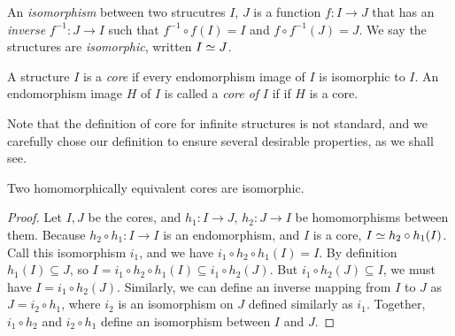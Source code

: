 \documentclass[acmsmall,screen,nonacm,review]{acmart}
\begin{document}
\begin{definition}
    An {\em isomorphism} between two strucutres $I$, $J$ 
    is a function $f: I \rightarrow J$ that 
    has an {\em inverse} $f^{-1}: J \rightarrow I$
    such that $f^{-1} \circ f (I)= I$ and $f \circ f^{-1} (J) = J$.
    We say the structures are {\em isomorphic}, written $I \simeq J$.
\end{definition}

\begin{definition}
    A structure $I$ is a {\em core} if every endomorphism image 
    of $I$ is isomorphic to $I$.
    An endomorphism image $H$ of $I$ is called a {\em core of} $I$ if 
    if $H$ is a core.
\end{definition}

Note that the definition of core for infinite structures is not standard, 
 and we carefully chose our definition to ensure several desirable properties, 
 as we shall see.

\begin{lemma}\label{lem:core-iso}
    Two homomorphically equivalent cores are isomorphic.
\end{lemma}
\begin{proof}
    Let $I, J$ be the cores,
    and $h_1: I \rightarrow J$, $h_2: J \rightarrow I$ be 
    homomorphisms between them.
    Because $h_2 \circ h_1 : I \rightarrow I$ is an endomorphism, 
    and $I$ is a core, $I \simeq h_2 \circ h_1(I)$.
    Call this isomorphism $i_1$, and we have $i_1 \circ h_2 \circ h_1(I) = I$.
    By definition $h_1(I) \subseteq J$, 
    so $I = i_1 \circ h_2 \circ h_1(I) \subseteq i_1 \circ h_2(J)$.
    But $i_1 \circ h_2(J) \subseteq I$,
    we must have $I = i_1 \circ h_2(J)$.
    Similarly, we can define an inverse mapping from $I$ to $J$
    as $J = i_2 \circ h_1$, where $i_2$ is an isomorphism on 
    $J$ defined similarly as $i_1$.
    Together, $i_1 \circ h_2$ and $i_2 \circ h_1$ define an isomorphism 
    between $I$ and $J$.
\end{proof}
\end{document}
